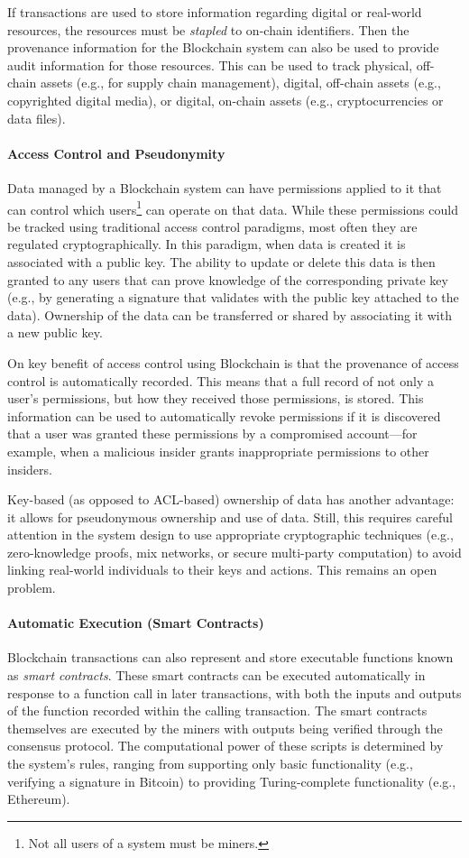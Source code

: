 If transactions are used to store information regarding digital or real-world resources, the resources must be \emph{stapled} to on-chain identifiers. Then the provenance information for the Blockchain system can also be used to provide audit information for those resources.
This can be used to track physical, off-chain assets (e.g., for supply chain management), digital, off-chain assets (e.g., copyrighted digital media), or digital, on-chain assets (e.g., cryptocurrencies or data files).
 
\paragraph{Access Control and Pseudonymity}

Data managed by a Blockchain system can have permissions applied to it that can control which users\footnote{Not all users of a system must be miners.} can operate on that data.
While these permissions could be tracked using traditional access control paradigms, most often they are regulated cryptographically.
In this paradigm, when data is created it is associated with a public key.
The ability to update or delete this data is then granted to any users that can prove knowledge of the corresponding private key (e.g., by generating a signature that validates with the public key attached to the data).
Ownership of the data can be transferred or shared by associating it with a new public key.

On key benefit of access control using Blockchain is that the provenance of access control is automatically recorded.
This means that a full record of not only a user's permissions, but how they received those permissions, is stored.
This information can be used to automatically revoke permissions if it is discovered that a user was granted these permissions by a compromised account---for example, when a malicious insider grants inappropriate permissions to other insiders.

Key-based (as opposed to ACL-based) ownership of data has another advantage: it allows for pseudonymous ownership and use of data.
Still, this requires careful attention in the system design to use appropriate cryptographic techniques (e.g., zero-knowledge proofs, mix networks, or secure multi-party computation) to avoid linking real-world individuals to their keys and actions. This remains an open problem.

\paragraph{Automatic Execution (Smart Contracts)}
Blockchain transactions can also represent and store executable functions known as \emph{smart contracts}.
These smart contracts can be executed automatically in response to a function call in later transactions, with both the inputs and outputs of the function recorded within the calling transaction.
The smart contracts themselves are executed by the miners with outputs being verified through the consensus protocol.
The computational power of these scripts is determined by the system's rules, ranging from supporting only basic functionality (e.g., verifying a signature in Bitcoin) to providing Turing-complete functionality (e.g., Ethereum).

